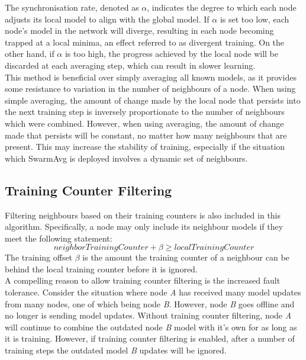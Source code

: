 \documentclass[letterpaper, 10 pt, conference]{ieeeconf}  %
\begin{document}
The synchronisation rate, denoted as $\alpha$, indicates the degree to which each node adjusts its local model to align with the global model. If $\alpha$ is set too low, each node's model in the network will diverge, resulting in each node becoming trapped at a local minima, an effect referred to as divergent training. On the other hand, if $\alpha$ is too high, the progress achieved by the local node will be discarded at each averaging step, which can result in slower learning. \\

This method is beneficial over simply averaging all known models, as it provides some resistance to variation in the number of neighbours of a node. When using simple averaging, the amount of change made by the local node that persists into the next training step is inversely proportionate to the number of neighbours which were combined. However, when using averaging, the amount of change made that persists will be constant, no matter how many neighbours that are present. This may increase the stability of training, especially if the situation which SwarmAvg is deployed involves a dynamic set of neighbours.

\subsection{Training Counter Filtering}
Filtering neighbours based on their training counters is also included in this algorithm. Specifically, a node may only include its neighbour models if they meet the following statement:
\[neighborTrainingCounter + \beta \ge localTrainingCounter \]
The training offset $\beta$ is the amount the training counter of a neighbour can be behind the local training counter before it is ignored. \\

A compelling reason to allow training counter filtering is the increased fault tolerance. Consider the situation where node \emph{A} has received many model updates from many nodes, one of which being node \emph{B}. However, node \emph{B} goes offline and no longer is sending model updates. Without training counter filtering, node \emph{A} will continue to combine the outdated node \emph{B} model with it's own for as long as it is training. However, if training counter filtering is enabled, after a number of training steps the outdated model \emph{B} updates will be ignored. \\
\end{document}
